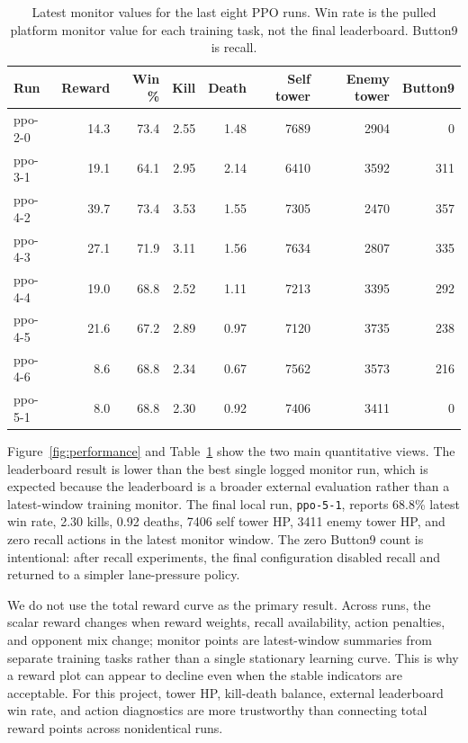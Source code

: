 \documentclass{article}
\begin{document}
\begin{table}[t]
  \centering
  \caption{Latest monitor values for the last eight PPO runs. Win rate is the pulled platform monitor value for each training task, not the final leaderboard. Button9 is recall.}
  \label{tab:runs}
  \small
  \begin{tabular}{lrrrrrrr}
    \toprule
    Run & Reward & Win \% & Kill & Death & Self tower & Enemy tower & Button9 \\
    \midrule
    ppo-2-0 & 14.3 & 73.4 & 2.55 & 1.48 & 7689 & 2904 & 0 \\
    ppo-3-1 & 19.1 & 64.1 & 2.95 & 2.14 & 6410 & 3592 & 311 \\
    ppo-4-2 & 39.7 & 73.4 & 3.53 & 1.55 & 7305 & 2470 & 357 \\
    ppo-4-3 & 27.1 & 71.9 & 3.11 & 1.56 & 7634 & 2807 & 335 \\
    ppo-4-4 & 19.0 & 68.8 & 2.52 & 1.11 & 7213 & 3395 & 292 \\
    ppo-4-5 & 21.6 & 67.2 & 2.89 & 0.97 & 7120 & 3735 & 238 \\
    ppo-4-6 & 8.6 & 68.8 & 2.34 & 0.67 & 7562 & 3573 & 216 \\
    ppo-5-1 & 8.0 & 68.8 & 2.30 & 0.92 & 7406 & 3411 & 0 \\
    \bottomrule
  \end{tabular}
\end{table}

Figure~\ref{fig:performance} and Table~\ref{tab:runs} show the two main quantitative views. The leaderboard result is lower than the best single logged monitor run, which is expected because the leaderboard is a broader external evaluation rather than a latest-window training monitor. The final local run, \texttt{ppo-5-1}, reports 68.8\% latest win rate, 2.30 kills, 0.92 deaths, 7406 self tower HP, 3411 enemy tower HP, and zero recall actions in the latest monitor window. The zero Button9 count is intentional: after recall experiments, the final configuration disabled recall and returned to a simpler lane-pressure policy.

We do not use the total reward curve as the primary result. Across runs, the scalar reward changes when reward weights, recall availability, action penalties, and opponent mix change; monitor points are latest-window summaries from separate training tasks rather than a single stationary learning curve. This is why a reward plot can appear to decline even when the stable indicators are acceptable. For this project, tower HP, kill-death balance, external leaderboard win rate, and action diagnostics are more trustworthy than connecting total reward points across nonidentical runs.
\end{document}
